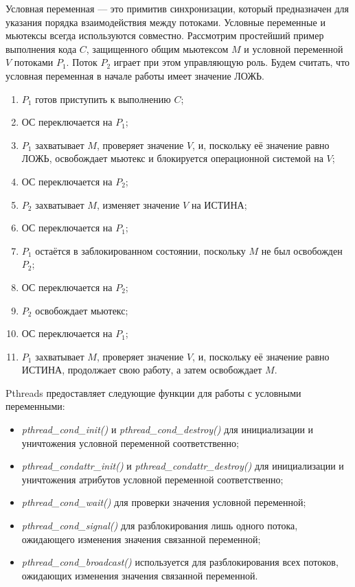 Условная переменная --- это примитив синхронизации,
который предназначен для указания порядка взаимодействия между потоками.
Условные переменные и мьютексы всегда используются совместно.
Рассмотрим простейший пример выполнения кода \( C \),
защищенного общим мьютексом \( M \) и условной переменной \( V \)
потоками \( P_1 \). Поток \( P_2 \) играет при этом управляющую роль.
Будем считать, что условная переменная в начале работы имеет значение ЛОЖЬ.
\begin{enumerate}
\item \( P_1 \) готов приступить к выполнению \( C \);
\item ОС переключается на \( P_1 \);
\item \( P_1 \) захватывает \( M \), проверяет значение \( V \), и,
  поскольку её значение равно ЛОЖЬ, освобождает мьютекс и блокируется операционной системой
  на \( V \);
\item ОС переключается на \( P_2 \);
\item \( P_2 \) захватывает \( M \), изменяет значение \( V \) на ИСТИНА;
\item ОС переключается на \( P_1 \);
\item \( P_1 \) остаётся в заблокированном состоянии, поскольку \( M \) не был освобожден \( P_2 \);
\item ОС переключается на \( P_2 \);
\item \( P_2 \) освобождает мьютекс;
\item ОС переключается на \( P_1 \);
\item \( P_1 \) захватывает \( M \), проверяет значение \( V \), и,
  поскольку её значение равно ИСТИНА, продолжает свою работу, а затем освобождает \( M \).
\end{enumerate}

Pthreads предоставляет следующие функции для работы с условными переменными:
\begin{itemize}
\item \textit{pthread\_cond\_init()} и \textit{pthread\_cond\_destroy()}
  для инициализации и уничтожения условной переменной соответственно;
\item \textit{pthread\_condattr\_init()} и \textit{pthread\_condattr\_destroy()}
  для инициализации и уничтожения атрибутов условной переменной соответственно;
\item \textit{pthread\_cond\_wait()} для проверки значения условной переменной;
\item \textit{pthread\_cond\_signal()} для разблокирования лишь одного потока,
  ожидающего изменения значения связанной переменной;
\item \textit{pthread\_cond\_broadcast()} используется для разблокирования всех потоков,
  ожидающих изменения значения связанной переменной.
\end{itemize}

